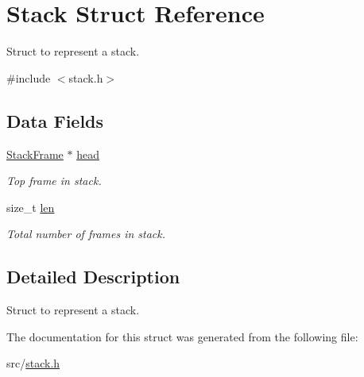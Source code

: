\hypertarget{structStack}{}\section{Stack Struct Reference}
\label{structStack}


Struct to represent a stack.  




{\ttfamily \#include $<$stack.\+h$>$}

\subsection*{Data Fields}
\begin{DoxyCompactItemize}
\item 
\mbox{\label{structStack_ad2b4b5aca386a85ade15354296241fe4}} 
\hyperlink{structStackFrame}{Stack\+Frame} $\ast$ \hyperlink{structStack_ad2b4b5aca386a85ade15354296241fe4}{head}
\begin{DoxyCompactList}\small\item\em Top frame in stack. \end{DoxyCompactList}\item 
\mbox{\label{structStack_ad1bf6e76611771f630f13166643a8662}} 
size\+\_\+t \hyperlink{structStack_ad1bf6e76611771f630f13166643a8662}{len}
\begin{DoxyCompactList}\small\item\em Total number of frames in stack. \end{DoxyCompactList}\end{DoxyCompactItemize}


\subsection{Detailed Description}
Struct to represent a stack. 

The documentation for this struct was generated from the following file\+:\begin{DoxyCompactItemize}
\item 
src/\hyperlink{stack_8h}{stack.\+h}\end{DoxyCompactItemize}
